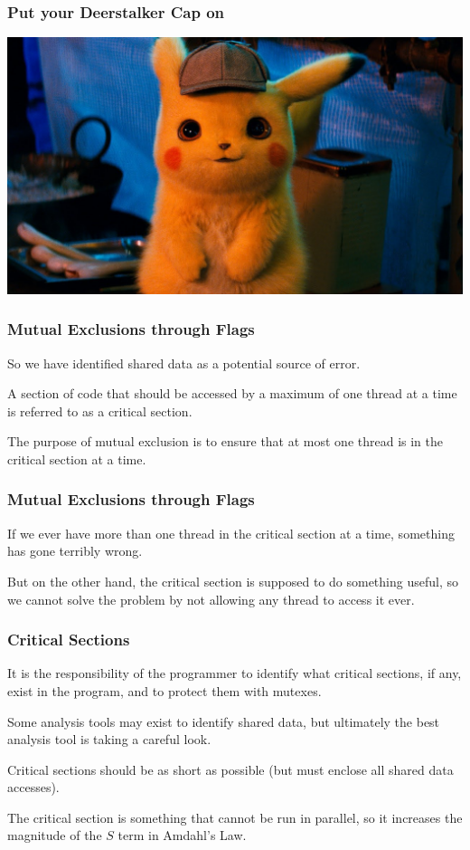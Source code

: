 \begin{frame}
\frametitle{Put your Deerstalker Cap on}

\begin{center}
	\includegraphics[width=\textwidth]{images/detectivepikachu.jpg}
\end{center}

\end{frame}


\begin{frame}
	\frametitle{Mutual Exclusions through Flags}

	So we have identified shared data as a potential source of error.

	A section of code that should be accessed by a maximum of one thread at a time is referred to as a \alert{critical section}.

	The purpose of mutual exclusion is to ensure that at most one thread is in the critical section at a time.
	
\end{frame}


\begin{frame}
	\frametitle{Mutual Exclusions through Flags}

	If we ever have more than one thread in the critical section at a time, something has gone terribly wrong.

	But on the other hand, the critical section is supposed to do something useful, so we cannot solve the problem by not allowing any thread to access it ever.

\end{frame}

\begin{frame}
	\frametitle{Critical Sections}

	It is the responsibility of the programmer to identify what critical sections, if any, exist in the program, and to protect them with mutexes.

	Some analysis tools may exist to identify shared data, but ultimately the best analysis tool is taking a careful look.

	Critical sections should be as short as possible (but must enclose all shared data accesses).

	The critical section is something that cannot be run in parallel, so it increases the magnitude of the $S$ term in Amdahl's Law.

\end{frame}

